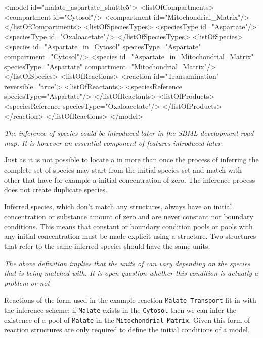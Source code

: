 \documentclass{cekarticle}
\begin{document}
\begin{example}
<model id="malate_aspartate_shuttle5">
    <listOfCompartments>
        <compartment id="Cytosol"/>
        <compartment id="Mitochondrial_Matrix"/>
    </listOfCompartments>
    <listOfSpeciesTypes>
        <speciesType id="Aspartate"/>
        <speciesType id="Oxaloacetate"/>
    </listOfSpeciesTypes>
    <listOfSpecies>
        <species
            id="Aspartate_in_Cytosol"
            speciesType="Aspartate"
            compartment="Cytosol"/>
        <species
            id="Aspartate_in_Mitochondrial_Matrix"
            speciesType="Aspartate"
            compartment="Mitochondrial_Matrix"/>
    </listOfSpecies>
    <listOfReactions>
        <reaction id="Transamination" reversible="true">
            <listOfReactants>
                <speciesReference speciesType="Aspartate"/>
            </listOfReactants>
            <listOfProducts>
                <speciesReference speciesType="Oxaloacetate"/>
            </listOfProducts>
        </reaction>
    </listOfReactions>
</model>
\end{example}

\emph{The inference of species could be introduced later in the SBML development road map.
It is however an essential component of features introduced later.}

Just as it is not possible to locate a  in  more than
once the process of inferring the complete set of species may start from the initial species
set and match with other  that have for example a initial concentration of zero.
The inference process does not create duplicate species.

Inferred species, which don't match any  structures, always have an initial
concentration or substance amount of zero and are never
constant nor boundary conditions.  This means that constant or boundary condition pools or pools
with any initial concentration must be made explicit using a  structure.
Two 
 structures that refer to the same inferred species should have
the same units.

\emph{The above definition implies that the units of  can vary
depending on the species that is being matched with.  It is open question whether this condition
is actually a problem or not}

Reactions of the form used in the example reaction \texttt{Malate\_Transport} fit in with the
inference scheme: if \texttt{Malate} exists in the
\texttt{Cytosol} then we can infer the existence of a pool of \texttt{Malate} in the
\texttt{Mitochondrial\_Matrix}.  Given this form of reaction  structures are only
required to define the initial conditions of a model.
\end{document}
